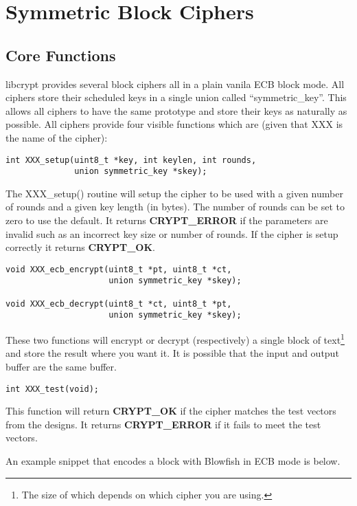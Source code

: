 \documentclass{book}
\begin{document}
\chapter{Symmetric Block Ciphers}
\section{Core Functions}

libcrypt provides several block ciphers all in a plain vanila ECB block mode.  All ciphers store their scheduled keys in
a single union called ``symmetric\_key''.  This allows all ciphers to have the same prototype and store their keys as 
naturally as possible.  All ciphers provide four visible functions which are (given that XXX is the name of the cipher):
\begin{verbatim}
int XXX_setup(uint8_t *key, int keylen, int rounds, 
              union symmetric_key *skey);
\end{verbatim}

The XXX\_setup() routine will setup the cipher to be used with a given number of rounds and a given key length (in bytes).  
The number of rounds can be set to zero to use the default.  It returns {\bf CRYPT\_ERROR} if the parameters are 
invalid such as an incorrect key size or number of rounds.  If the cipher is setup correctly it returns {\bf CRYPT\_OK}.

\begin{verbatim}
void XXX_ecb_encrypt(uint8_t *pt, uint8_t *ct,
                     union symmetric_key *skey);

void XXX_ecb_decrypt(uint8_t *ct, uint8_t *pt,
                     union symmetric_key *skey);
\end{verbatim}

These two functions will encrypt or decrypt (respectively) a single block of text\footnote{The size of which depends on which cipher you are using.}
 and store the result where you want it.  It is possible that the input and output buffer are the same buffer.

\begin{verbatim}
int XXX_test(void);
\end{verbatim}

This function will return {\bf CRYPT\_OK} if the cipher matches the test vectors from the designs.  It returns 
{\bf CRYPT\_ERROR} if it fails to meet the test vectors.

An example snippet that encodes a block with Blowfish in ECB mode is below.
\end{document}
